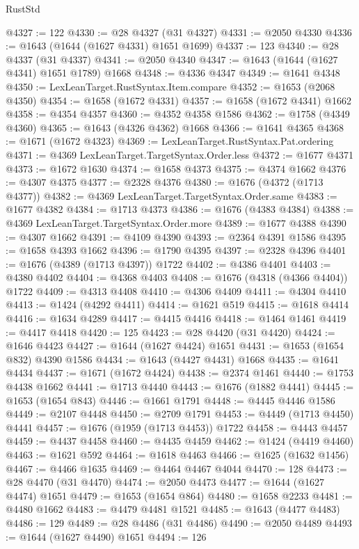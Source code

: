 \begin{lexlean}{RustStd}
\begin{coremodule}
@4327 := 122
@4330 := @28 @4327 (@31 @4327)
@4331 := @2050 @4330
@4336 := @1643 (@1644 (@1627 @4331) @1651 @1699)
@4337 := 123
@4340 := @28 @4337 (@31 @4337)
@4341 := @2050 @4340
@4347 := @1643 (@1644 (@1627 @4341) @1651 @1789) @1668
@4348 := @4336 @4347
@4349 := @1641 @4348
@4350 := LexLeanTarget.RustSyntax.Item.compare
@4352 := @1653 (@2068 @4350)
@4354 := @1658 (@1672 @4331)
@4357 := @1658 (@1672 @4341) @1662
@4358 := @4354 @4357
@4360 := @4352 @4358 @1586
@4362 := @1758 (@4349 @4360)
@4365 := @1643 (@4326 @4362) @1668
@4366 := @1641 @4365
@4368 := @1671 (@1672 @4323)
@4369 := LexLeanTarget.RustSyntax.Pat.ordering
@4371 := @4369 LexLeanTarget.TargetSyntax.Order.less
@4372 := @1677 @4371
@4373 := @1672 @1630
@4374 := @1658 @4373
@4375 := @4374 @1662
@4376 := @4307 @4375
@4377 := @2328 @4376
@4380 := @1676 (@4372 (@1713 @4377))
@4382 := @4369 LexLeanTarget.TargetSyntax.Order.same
@4383 := @1677 @4382
@4384 := @1713 @4373
@4386 := @1676 (@4383 @4384)
@4388 := @4369 LexLeanTarget.TargetSyntax.Order.more
@4389 := @1677 @4388
@4390 := @4307 @1662
@4391 := @4109 @4390
@4393 := @2364 @4391 @1586
@4395 := @1658 @4393 @1662
@4396 := @1790 @4395
@4397 := @2328 @4396
@4401 := @1676 (@4389 (@1713 @4397)) @1722
@4402 := @4386 @4401
@4403 := @4380 @4402
@4404 := @4368 @4403
@4408 := @1676 (@4318 (@4366 @4404)) @1722
@4409 := @4313 @4408
@4410 := @4306 @4409
@4411 := @4304 @4410
@4413 := @1424 (@4292 @4411)
@4414 := @1621 @519
@4415 := @1618 @4414
@4416 := @1634 @4289
@4417 := @4415 @4416
@4418 := @1464 @1461
@4419 := @4417 @4418
@4420 := 125
@4423 := @28 @4420 (@31 @4420)
@4424 := @1646 @4423
@4427 := @1644 (@1627 @4424) @1651
@4431 := @1653 (@1654 @832) @4390 @1586
@4434 := @1643 (@4427 @4431) @1668
@4435 := @1641 @4434
@4437 := @1671 (@1672 @4424)
@4438 := @2374 @1461
@4440 := @1753 @4438 @1662
@4441 := @1713 @4440
@4443 := @1676 (@1882 @4441)
@4445 := @1653 (@1654 @843)
@4446 := @1661 @1791
@4448 := @4445 @4446 @1586
@4449 := @2107 @4448
@4450 := @2709 @1791
@4453 := @4449 (@1713 @4450) @4441
@4457 := @1676 (@1959 (@1713 @4453)) @1722
@4458 := @4443 @4457
@4459 := @4437 @4458
@4460 := @4435 @4459
@4462 := @1424 (@4419 @4460)
@4463 := @1621 @592
@4464 := @1618 @4463
@4466 := @1625 (@1632 @1456)
@4467 := @4466 @1635
@4469 := @4464 @4467 @4044
@4470 := 128
@4473 := @28 @4470 (@31 @4470)
@4474 := @2050 @4473
@4477 := @1644 (@1627 @4474) @1651
@4479 := @1653 (@1654 @864)
@4480 := @1658 @2233
@4481 := @4480 @1662
@4483 := @4479 @4481 @1521
@4485 := @1643 (@4477 @4483)
@4486 := 129
@4489 := @28 @4486 (@31 @4486)
@4490 := @2050 @4489
@4493 := @1644 (@1627 @4490) @1651
@4494 := 126

\end{coremodule}
\end{lexlean}
